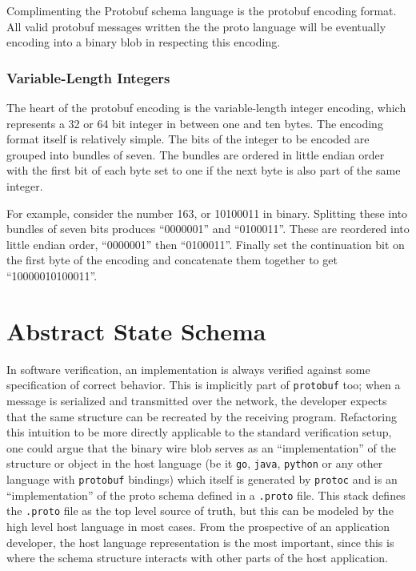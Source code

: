 \documentclass[11pt]{article}
\theoremstyle{definition}
\begin{document}
Complimenting the Protobuf schema language is the protobuf encoding format. All
valid protobuf messages written the the proto language will be eventually
encoding into a binary blob in respecting this encoding.

\subsubsection{Variable-Length Integers}

The heart of the protobuf encoding is the variable-length integer encoding,
which represents a 32 or 64 bit integer in between one and ten bytes. The
encoding format itself is relatively simple. The bits of the integer to be
encoded are grouped into bundles of seven. The bundles are ordered in little
endian order with the first bit of each byte set to one if the next byte is also
part of the same integer.

For example, consider the number 163, or 10100011 in binary. Splitting these
into bundles of seven bits produces ``0000001'' and ``0100011''. These are
reordered into little endian order, ``0000001'' then ``0100011''. Finally set
the continuation bit on the first byte of the encoding and concatenate them
together to get ``10000010100011''.

\section{Abstract State Schema}

In software verification, an implementation is always verified against some
specification of correct behavior. This is implicitly part of
\texttt{protobuf} too; when a message is serialized and transmitted over the
network, the developer expects that the same structure can be recreated by the
receiving program. Refactoring this intuition to be more directly applicable to
the standard verification setup, one could argue that the binary wire blob
serves as an ``implementation'' of the structure or object in the host
language (be it \texttt{go}, \texttt{java}, \texttt{python} or any other
language with \texttt{protobuf} bindings) which itself is generated by
\texttt{protoc} and is an ``implementation'' of the proto schema defined in a
\texttt{.proto} file. This stack defines the \texttt{.proto} file as the top
level source of truth, but this can be modeled by the high level host language
in most cases. From the prospective of an application developer, the host
language representation is the most important, since this is where the schema
structure interacts with other parts of the host application.
\end{document}
